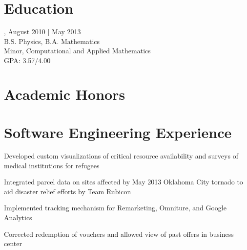 \documentclass{onkursen-resume}
\begin{document}
\vspace{0.5mm}

\begin{multicols}{2}

\section*{Education}
, August 2010 | May 2013\\
B.S. Physics, B.A. Mathematics\\
Minor, Computational and Applied Mathematics\\
GPA: 3.57/4.00

\section*{Academic Honors}

\end{multicols}

\vspace{-4mm}

\hr

\section*{Software Engineering Experience}

\begin{itemize*}
\item Developed custom visualizations of critical resource availability and surveys of medical institutions for refugees
\item Integrated parcel data on sites affected by May 2013 Oklahoma City tornado to aid disaster relief efforts by Team Rubicon
\end{itemize*}

\begin{itemize*}
\item Implemented tracking mechanism for Remarketing, Omniture, and Google Analytics
\item Corrected redemption of vouchers and allowed view of past offers in business center
\end{itemize*}
\end{document}
